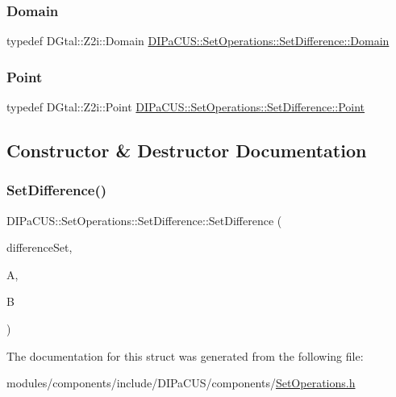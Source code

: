 \subsubsection{\texorpdfstring{Domain}{Domain}}
{\footnotesize\ttfamily typedef D\+Gtal\+::\+Z2i\+::\+Domain \mbox{\hyperlink{structDIPaCUS_1_1SetOperations_1_1SetDifference_aed21483576b1d6d75f3ca062d7ee15ad}{D\+I\+Pa\+C\+U\+S\+::\+Set\+Operations\+::\+Set\+Difference\+::\+Domain}}}

\mbox{\label{structDIPaCUS_1_1SetOperations_1_1SetDifference_acb0cc5c28b3744944fe56e7e765924e8}} 
\subsubsection{\texorpdfstring{Point}{Point}}
{\footnotesize\ttfamily typedef D\+Gtal\+::\+Z2i\+::\+Point \mbox{\hyperlink{structDIPaCUS_1_1SetOperations_1_1SetDifference_acb0cc5c28b3744944fe56e7e765924e8}{D\+I\+Pa\+C\+U\+S\+::\+Set\+Operations\+::\+Set\+Difference\+::\+Point}}}



\subsection{Constructor \& Destructor Documentation}
\mbox{\label{structDIPaCUS_1_1SetOperations_1_1SetDifference_ae616c273fb711dcd2a982e06034b1967}} 
\subsubsection{\texorpdfstring{Set\+Difference()}{SetDifference()}}
{\footnotesize\ttfamily D\+I\+Pa\+C\+U\+S\+::\+Set\+Operations\+::\+Set\+Difference\+::\+Set\+Difference (\begin{DoxyParamCaption}\item[{\mbox{\hyperlink{structDIPaCUS_1_1SetOperations_1_1SetDifference_aeaafa3335e3f7cb0918a015a64b711ac}{Digital\+Set}} \&}]{difference\+Set,  }\item[{const \mbox{\hyperlink{structDIPaCUS_1_1SetOperations_1_1SetDifference_aeaafa3335e3f7cb0918a015a64b711ac}{Digital\+Set}} \&}]{A,  }\item[{const \mbox{\hyperlink{structDIPaCUS_1_1SetOperations_1_1SetDifference_aeaafa3335e3f7cb0918a015a64b711ac}{Digital\+Set}} \&}]{B }\end{DoxyParamCaption})}



The documentation for this struct was generated from the following file\+:\begin{DoxyCompactItemize}
\item 
modules/components/include/\+D\+I\+Pa\+C\+U\+S/components/\mbox{\hyperlink{SetOperations_8h}{Set\+Operations.\+h}}\end{DoxyCompactItemize}
